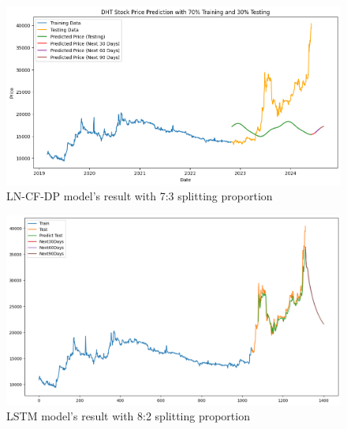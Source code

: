 \documentclass{ieeeojies}
\begin{document}
\begin{figure}[H]
  \centering
  \begin{minipage}{0.8\linewidth}
    \centering
    \includegraphics[width=\linewidth]{bibliography/Figure/DHT_LN_CF&DP.png}
    \caption{LN-CF-DP model's result with 7:3 splitting proportion}
    \label{fig8}
  \end{minipage}
\end{figure}

\begin{figure}[H]
  \centering
  \begin{minipage}{0.8\linewidth}
    \centering
    \includegraphics[width=\linewidth]{bibliography/Figure/LSTM_DHT(8_2).png}
    \caption{LSTM model's result with 8:2 splitting proportion}
    \label{fig8}
  \end{minipage}
\end{figure}
\end{document}

